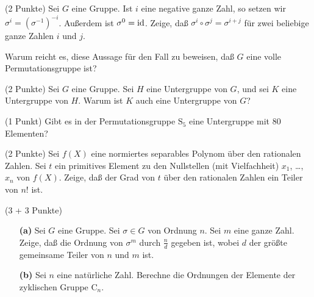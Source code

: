 \documentclass{algsheet}
\author{Dipl.-Math.~Franz Vogler}
\date{18.~Januar 2011}
\begin{document}
                \maketitle



\begin{exercise}(2 Punkte)\newline
    Sei \(G\) eine Gruppe. Ist \(i\) eine negative ganze Zahl, so setzen wir
    \(\sigma^{i} = (\sigma^{-1})^{-i}\). Außerdem ist \(\sigma^0 = \operatorname{id}\). Zeige, daß
    \(\sigma^i \circ \sigma^j = \sigma^{i + j}\) für zwei beliebige ganze Zahlen \(i\) und \(j\).
    
    Warum reicht es, diese Aussage für den Fall zu beweisen, daß \(G\) eine volle Permutationsgruppe ist?
\end{exercise}


\begin{exercise}(2 Punkte)\newline
    Sei \(G\) eine Gruppe. Sei \(H\) eine Untergruppe von \(G\), und sei \(K\) eine Untergruppe von \(H\).
    Warum ist \(K\) auch eine Untergruppe von \(G\)?
\end{exercise}



\begin{exercise}(1 Punkt)\newline
    Gibt es in der Permutationsgruppe \(\mathrm S_5\) eine Untergruppe mit \(80\) Elementen?    
\end{exercise}

\begin{exercise}(2 Punkte)\newline
    Sei \(f(X)\) eine normiertes separables Polynom über den rationalen Zahlen. Sei \(t\) ein
    primitives Element zu den Nullstellen (mit Vielfachheit) \(x_1\), \dots, \(x_n\) von \(f(X)\).
    Zeige, daß der Grad von \(t\) über den rationalen Zahlen ein Teiler von \(n!\) ist.
\end{exercise}



\begin{exercise}(3 + 3 Punkte)
   \begin{itemize}
    \item[\textbf{(a)}]     Sei \(G\) eine Gruppe. Sei \(\sigma \in G\) von Ordnung \(n\). Sei \(m\) eine ganze Zahl. Zeige, daß
    die Ordnung von \(\sigma^m\) durch \(\frac n d\) gegeben ist, wobei \(d\) der größte gemeinsame Teiler
    von \(n\) und \(m\) ist.

   \item[\textbf{(b)}]  Sei \(n\) eine natürliche Zahl. 
                Berechne die Ordnungen der Elemente der zyklischen Gruppe \(\mathrm C_n\).
   \end{itemize}
\end{exercise}
\end{document}
